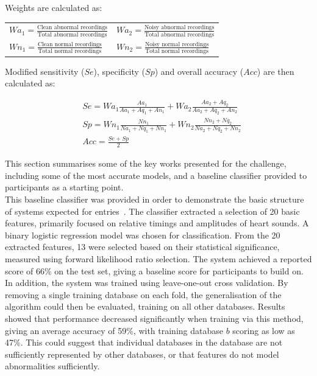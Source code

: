 \documentclass[titlepage, 12pt]{scrartcl} \usepackage{enumitem}
\begin{document}
\doublespacing

Weights are calculated as:
\begin{table}[H]
\centering
\doublespacing
\begin{tabular}{ll}
$Wa_1 = \frac{\text{Clean abnormal recordings}}{\text{Total abnormal recordings}}$ & $Wa_2 = \frac{\text{Noisy abnormal recordings}}{\text{Total abnormal recordings}}$ \\
$Wn_1 = \frac{\text{Clean normal recordings}}{\text{Total normal recordings}}$     & $Wn_2 = \frac{\text{Noisy normal recordings}}{\text{Total normal recordings}}$
\end{tabular}
\end{table}

Modified sensitivity ($Se$), specificity ($Sp$) and overall accuracy ($Acc$) are then calculated as:

\begin{align*}
    &Se=Wa_1\frac{Aa_1}{Aa_1+Aq_1+An_1}+Wa_2\frac{Aa_2+Aq_2}{Aa_2+Aq_2+An_2} \\
    &Sp=Wn_1\frac{Nn_1}{Na_1+Nq_1+Nn_1}+Wn_2\frac{Nn_2+Nq_2}{Na_2+Nq_2+Nn_2} \\
    &Acc=\frac{Se+Sp}{2}
\end{align*}

This section summarises some of the key works presented for the challenge,
including some of the most accurate models, and a baseline classifier
provided to participants as a starting point.\\

This baseline classifier was provided in order to demonstrate the basic
structure of systems expected for entries~\parencite{Liu2016}. The classifier
extracted a selection of 20 basic features, primarily focused on relative
timings and amplitudes of heart sounds.  A binary logistic regression model was
chosen for classification. From the 20 extracted features, 13 were selected
based on their statistical significance, measured using forward likelihood ratio
selection. The system achieved a reported score of 66\% on the test set, giving
a baseline score for participants to build on.  In addition, the system was
trained using leave-one-out cross validation. By removing a single training
database on each fold, the generalisation of the algorithm could then be
evaluated, training on all other databases. Results showed that performance
decreased significantly when training via this method, giving an average
accuracy of 59\%, with training database $b$ scoring as low as 47\%.  This
could suggest that individual databases in the database are not sufficiently
represented by other databases, or that features do not model abnormalities
sufficiently.\\
\end{document}

